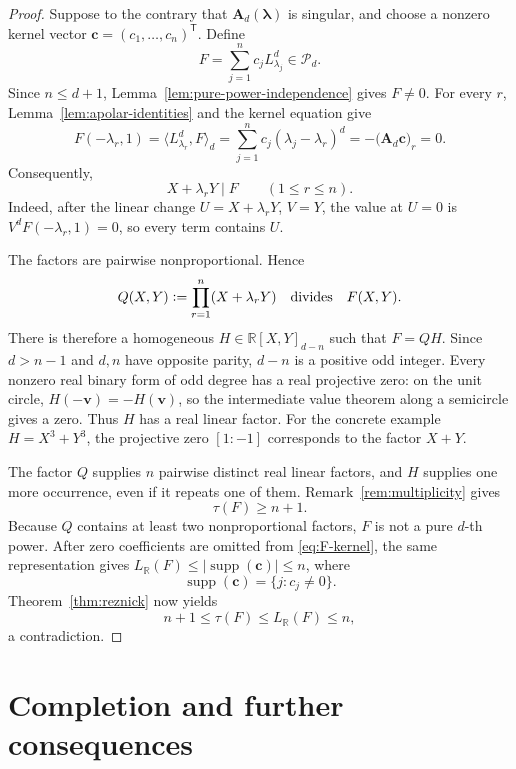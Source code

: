 \documentclass[11pt,letterpaper,reqno]{amsart}
\numberwithin{equation}{section}
\theoremstyle{definition}
\newcommand{\RR}{\mathbb{R}}
\newcommand{\cP}{\mathcal{P}}
\newcommand{\LR}{L_{\RR}}
\newcommand{\defeq}{\mathrel{\vcentcolon=}}
\newcommand{\Mat}[1]{\mathbf{#1}}
\newcommand{\vct}[1]{\boldsymbol{#1}}
\begin{document}
\begin{proof}
Suppose to the contrary that \(\Mat{A}_d(\vct{\lambda})\) is singular,
and choose a nonzero kernel vector
\(\vct{c}=(c_1,\ldots,c_n)^{\mathsf T}\).  Define
\begin{equation}\label{eq:F-kernel}
 F=\sum_{j=1}^n c_jL_{\lambda_j}^d\in\cP_d.
\end{equation}
Since \(n\le d+1\), Lemma~\ref{lem:pure-power-independence} gives
\(F\ne0\).  For every \(r\), Lemma~\ref{lem:apolar-identities} and the
kernel equation give
\[
 F(-\lambda_r,1)
 =\langle L_{\lambda_r}^d,F\rangle_d
 =\sum_{j=1}^n c_j(\lambda_j-\lambda_r)^d
 =-\bigl(\Mat{A}_d\vct{c}\bigr)_r=0.
\]
Consequently,
\[
 X+\lambda_rY\mid F
 \qquad(1\le r\le n).
\]
Indeed, after the linear change \(U=X+\lambda_rY\), \(V=Y\), the value
at \(U=0\) is \(V^dF(-\lambda_r,1)=0\), so every term contains \(U\).

The factors are pairwise nonproportional.  Hence
\begin{equation}\label{eq:Q-divides-F}
 Q(X,Y)\defeq\prod_{r=1}^n(X+\lambda_rY)
 \quad\text{divides}\quad F(X,Y).
\end{equation}
There is therefore a homogeneous \(H\in\RR[X,Y]_{d-n}\) such that
\(F=QH\).  Since \(d>n-1\) and \(d,n\) have opposite parity,
\(d-n\) is a positive odd integer.  Every nonzero real binary form of
odd degree has a real projective zero: on the unit circle,
\(H(-\vct v)=-H(\vct v)\), so the intermediate value theorem along a
semicircle gives a zero.  Thus \(H\) has a real linear factor.
For the concrete example \(H=X^3+Y^3\), the projective zero
\([1:-1]\) corresponds to the factor \(X+Y\).

The factor \(Q\) supplies \(n\) pairwise distinct real linear factors,
and \(H\) supplies one more occurrence, even if it repeats one of them.
Remark~\ref{rem:multiplicity} gives
\begin{equation}\label{eq:tau-lower}
 \tau(F)\ge n+1.
\end{equation}
Because \(Q\) contains at least two nonproportional factors, \(F\) is
not a pure \(d\)-th power.  After zero coefficients are omitted from
\eqref{eq:F-kernel}, the same representation gives
\(\LR(F)\le |\operatorname{supp}(\vct c)|\le n\), where
\[
 \operatorname{supp}(\vct c)=\{j:c_j\ne0\}.
\]
Theorem~\ref{thm:reznick} now yields
\[
 n+1\le\tau(F)\le\LR(F)\le n,
\]
a contradiction.
\end{proof}

\section{Completion and further consequences}
\label{sec:completion}
\end{document}
